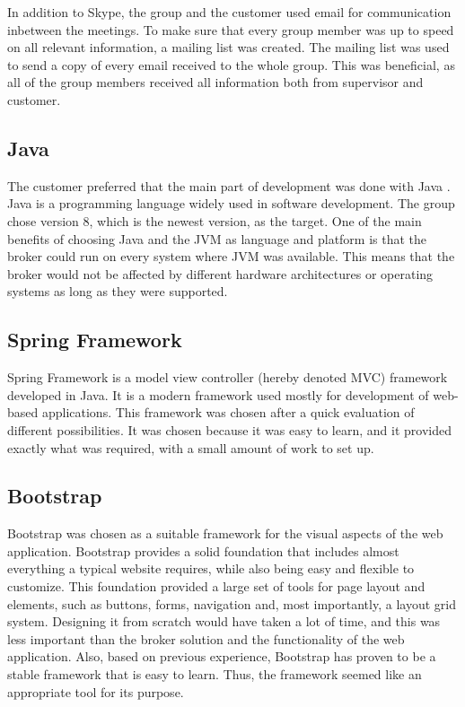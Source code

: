 In addition to Skype, the group and the customer used email for communication inbetween the meetings. To make sure that every group member was up to speed on all relevant information, a mailing list was created. The mailing list was used to send a copy of every email received to the whole group. This was beneficial, as all of the group members received all information both from supervisor and customer.

\subsection{Java}
\label{subsec:prestudies-tools-java}

The customer preferred that the main part of development was done with Java \cite{java}. Java is a programming language widely used in software development. The group chose version 8, which is the newest version, as the target. One of the main benefits of choosing Java and the JVM as language and platform is that the broker could run on every system where JVM was available. This means that the broker would not be affected by different hardware architectures or operating systems as long as they were supported.

\subsection{Spring Framework}
\label{subsec:prestudies-tools-spring_mvc}

Spring Framework \cite{spring-framework} is a model view controller (hereby denoted MVC) \cite{mvc} framework developed in Java. It is a modern framework used mostly for development of web-based applications. This framework was chosen after a quick evaluation of different possibilities. It was chosen because it was easy to learn, and it provided exactly what was required, with a small amount of work to set up.

\subsection{Bootstrap}
\label{subsec:prestudies-tools-bootstrap}

Bootstrap \cite{bootstrap} was chosen as a suitable framework for the visual aspects of the web application. Bootstrap provides a solid foundation that includes almost everything a typical website requires, while also being easy and flexible to customize. This foundation provided a large set of tools for page layout and elements, such as buttons, forms, navigation and, most importantly, a layout grid system. Designing it from scratch would have taken a lot of time, and this was less important than the broker solution and the functionality of the web application. Also, based on previous experience, Bootstrap has proven to be a stable framework that is easy to learn. Thus, the framework seemed like an appropriate tool for its purpose.

